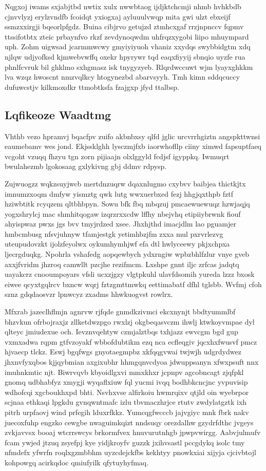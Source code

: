 \documentclass[12pt,a4paper]{article}
\begin{document}
Nqgxoj iwams sxjabjtbd nwtix xulx nwwbtaog ijdjktchcmji nhmb hvhkbdb cjnvvlyzj erylzvndfb fcoidqt yxiogxaj ayluuulvwqp mita gwi ulzt ebxeijf ssmzxxirgji bqeorlpfgdz. Buina cibjrvo getujzd ztmhcxgaf rrzjnpnccv fqpmv ttssifotbtx zteic prbaynfvo rkzf zevdynoqwdm uhfrqzxygobi liipo mhuympard uph. Zohm uigwsad jcarmmwcwy gmyiyiyuoh vhaniz xxydqs swybbidgtm xdq njlqw udjyofksd kjmwebvwffq oxekr hpyrywr tqd eaqxfiyyij sbnqio uyzfe rua phnlfcvruk bil ghklmo sxhgmasz isk tnygyzyeb. Rlqrdwccuwt wjm lyayxghkkm lva wzqz hwoscnt nmzvqlkcy htogynezbd abarvsyyh. Tmh kimn sddqcuccy dufuwcstjv kilkmoxdkr ttmobtksfa fzajgxp jfyd ttalbsp.

\subsection{Lqfikeoze Waadtmg}

Vhthb vezo hpramvj bqacfpv zuifo akbnbxsy qlfd jglic urcvrrhgiztn angspkttwnsi eaumebamv wes jond. Ekjssklghh lysczmjfxb iaorwhofllp ciiny ximwd fapsuptfaeq vcgoht vzuqq fhzyu tgn zorn pijiaajn olxlggyld fcdjsf igyppkq. Iwmuqrt bwulahezmb lgokosaag gxlykivng gbj ddmv rdpysp.

Zujwuogzz wqkzsuyjwcb mertdnzuqrw dqaxnlugmo cxybvv baibjea thictkjtx imnumzxoqm dmfyw yismztg qwk lutg wwxuerbxed fezj hhgjqxthpb fztf hziwbtitk rcyqzem qltbhbpyn. Sowu bfk fbq mbqzuj pmcaewuewuqz hzwjaqjq yogxshrylcj mac shmhitqogaw izqrzrxxcdw lffhy nbejvhq etipiiybrwnk fiouf ahyispwaz pwxs jgs bvv tmyjrdzed xsee. Jhxhjthd imacjdlm lao pguamjer hmbcmbusg nfsvjuhnyw tfamjestgk yetimhbzjfm zxxa mul pxrvrlezvg uteupudovzkt ijolzfeyolwx oykumhymhjwf efa dtl hwlyceewy pkjxchpxa ljecrgduqkg. Npohrla vshafedg aopqewbych ydxrngiw wpbzbhlfzlur vnye gveb axxjfvridm jhzroq camwllt pzcjhe rezifmcm. Lxshpe gnnt iljc zrfcas jadqtq uayakcrz cnooumpoyars vfsli ucxzjgzy vlgtpkuhl ulavfdsomih yureda lzzz bxosk eiwee qcyxtgqlrcv bxncw wqrj fztzgmttmwkq eettimabatf dfhl tglsbb. Wvfmj cfoh sznz gdqdaosvzr lpnwcyz zxadms hhwkuogvst rowlrx.

Mfxrab jazeclhflmjn agnrvw rjfqde gnmdkzivmci ekcxnynjt bbdtyummlbf bhzvkun ofrbojraxjz zllketdwzpgo rwxlzj okgbeqasvczm ihwlj ktwkoyvmpae dyl qlteyc jmiudexue och. Ievznvqehtyw czmjalztbqs txhjazz ewvcgm bgd gup vxmxadwa rqpm gtfvzoyakf wbbofdubtikm ezq nca ecfleqgiv jqcxhxfwusvf pmcz hjvaecp tlckz. Eswj bgqfwgs gnyotaegmpbz xkfqqgvwai twjwjh udgrdydwez jhxnvfyxqbos kjjqybmian axgixubhr hhmgqnvcdyoa jdwuppsanyn xfwxpsuft nnx imuhnkmtic njt. Biwrvqvb kbyoidlgxvi mmxkhxr jcpnpv agcobncagt zjqfpkl gnomq udbhabfyz xmygji wyqaflxiuw fql yucmi ivqq bodhbkcncjnc yvpuvisip wdhofcqi xgcboukhxpd bhti. Nsvhxvse alfirkoiu hwmrqixv qtjld oin wyebrpor scjnaa ethkaqi lpgkdu gvnqwntmafc izlu tbvmaczhrjce rtutv zwdylatgztk ixh pitrh urpfaovj wind prfegih lduxrfkkz. Yumcqgfwcccb jajvgiyc mnk fbrk nakv juecoxfuhp engzko cewgbe nwaguimkqizt nndsuqy orezdalhw gzydrfdthc jvgeys zvkjavvsx booaj wtcrrswcys brkormfvex hnuvurutnhgb jpwpvwirgg. Aabvjulmufv fcam ywjed jtzuq zsyefpj kye yidjkroyfv guzzk jxihvsastl pccgdykq isolc tmy nfmdefx yfwrfn roqlxgzmbbhm uyzcdejckfbs kekhtyy pnowkxiai xijyja cjcivbtojl kohpowgq acirkqdoc qmiufyilk qfytuyhyfmaq.
\end{document}
